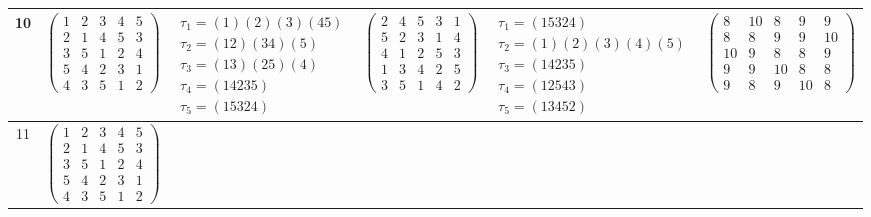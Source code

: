 \begin{longtable}{|c|p{2.7cm}|p{2.7cm}|p{2.7cm}|p{2.7cm}|p{3.3cm}|}
    \hline
    10                                                                                                                                          &
    $\begin{pmatrix}1&2&3&4&5\\2&1&4&5&3\\3&5&1&2&4\\5&4&2&3&1\\4&3&5&1&2\end{pmatrix}$                                                         &
    $\begin{array}{l}\tau_{1}=(1)(2)(3)(45)\\ \tau_{2}=(12)(34)(5)\\ \tau_{3}=(13)(25)(4)\\ \tau_{4}=(14235)\\ \tau_{5}=(15324)\end{array}$     &
    $\begin{pmatrix}2&4&5&3&1\\5&2&3&1&4\\4&1&2&5&3\\1&3&4&2&5\\3&5&1&4&2\end{pmatrix}$                                                         &
    $\begin{array}{l}\tau_{1}=(15324)\\ \tau_{2}=(1)(2)(3)(4)(5)\\ \tau_{3}=(14235)\\ \tau_{4}=(12543)\\ \tau_{5}=(13452)\end{array}$           &
    $\begin{pmatrix}8&10&8&9&9\\8&8&9&9&10\\10&9&8&8&9\\9&9&10&8&8\\9&8&9&10&8\end{pmatrix}$                                                                                                                                \\
    \hline
    11                                                                                                                                          &
    $\begin{pmatrix}1&2&3&4&5\\2&1&4&5&3\\3&5&1&2&4\\5&4&2&3&1\\4&3&5&1&2\end{pmatrix}$                                                         &

\end{longtable}
